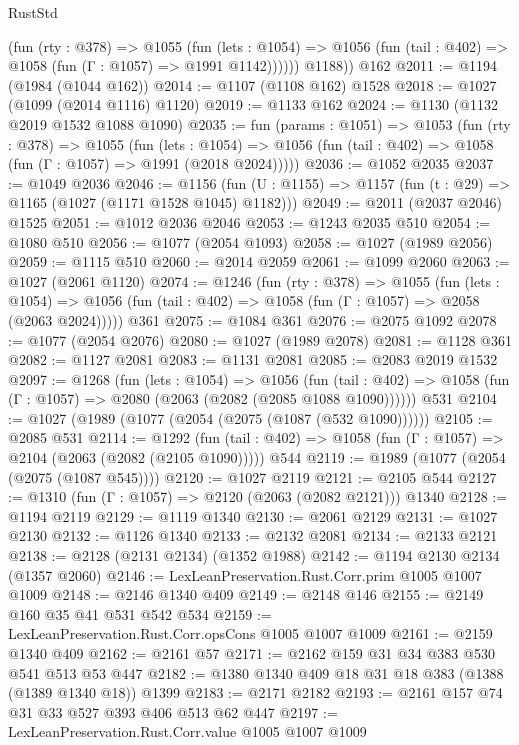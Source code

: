 \begin{lexlean}{RustStd}
\begin{coremodule}
            (fun (rty : @378) =>
            @1055
              (fun (lets : @1054) =>
              @1056 (fun (tail : @402) => @1058 (fun (Γ : @1057) => @1991 @1142))))))
        @1188))
    @162
@2011 := @1194 (@1984 (@1044 @162))
@2014 := @1107 (@1108 @162) @1528
@2018 := @1027 (@1099 (@2014 @1116) @1120)
@2019 := @1133 @162
@2024 := @1130 (@1132 @2019 @1532 @1088 @1090)
@2035 := fun (params : @1051) =>
  @1053
    (fun (rty : @378) =>
    @1055
      (fun (lets : @1054) =>
      @1056 (fun (tail : @402) => @1058 (fun (Γ : @1057) => @1991 (@2018 @2024)))))
@2036 := @1052 @2035
@2037 := @1049 @2036
@2046 := @1156 (fun (U : @1155) => @1157 (fun (t : @29) => @1165 (@1027 (@1171 @1528 @1045) @1182)))
@2049 := @2011 (@2037 @2046) @1525
@2051 := @1012 @2036 @2046
@2053 := @1243 @2035 @510
@2054 := @1080 @510
@2056 := @1077 (@2054 @1093)
@2058 := @1027 (@1989 @2056)
@2059 := @1115 @510
@2060 := @2014 @2059
@2061 := @1099 @2060
@2063 := @1027 (@2061 @1120)
@2074 := @1246
    (fun (rty : @378) =>
    @1055
      (fun (lets : @1054) =>
      @1056 (fun (tail : @402) => @1058 (fun (Γ : @1057) => @2058 (@2063 @2024)))))
    @361
@2075 := @1084 @361
@2076 := @2075 @1092
@2078 := @1077 (@2054 @2076)
@2080 := @1027 (@1989 @2078)
@2081 := @1128 @361
@2082 := @1127 @2081
@2083 := @1131 @2081
@2085 := @2083 @2019 @1532
@2097 := @1268
    (fun (lets : @1054) =>
    @1056
      (fun (tail : @402) => @1058 (fun (Γ : @1057) => @2080 (@2063 (@2082 (@2085 @1088 @1090))))))
    @531
@2104 := @1027 (@1989 (@1077 (@2054 (@2075 (@1087 (@532 @1090))))))
@2105 := @2085 @531
@2114 := @1292
    (fun (tail : @402) => @1058 (fun (Γ : @1057) => @2104 (@2063 (@2082 (@2105 @1090)))))
    @544
@2119 := @1989 (@1077 (@2054 (@2075 (@1087 @545))))
@2120 := @1027 @2119
@2121 := @2105 @544
@2127 := @1310 (fun (Γ : @1057) => @2120 (@2063 (@2082 @2121))) @1340
@2128 := @1194 @2119
@2129 := @1119 @1340
@2130 := @2061 @2129
@2131 := @1027 @2130
@2132 := @1126 @1340
@2133 := @2132 @2081
@2134 := @2133 @2121
@2138 := @2128 (@2131 @2134) (@1352 @1988)
@2142 := @1194 @2130 @2134 (@1357 @2060)
@2146 := LexLeanPreservation.Rust.Corr.prim @1005 @1007 @1009
@2148 := @2146 @1340 @409
@2149 := @2148 @146
@2155 := @2149 @160 @35 @41 @531 @542 @534
@2159 := LexLeanPreservation.Rust.Corr.opsCons @1005 @1007 @1009
@2161 := @2159 @1340 @409
@2162 := @2161 @57
@2171 := @2162 @159 @31 @34 @383 @530 @541 @513 @53 @447
@2182 := @1380 @1340 @409 @18 @31 @18 @383 (@1388 (@1389 @1340 @18)) @1399
@2183 := @2171 @2182
@2193 := @2161 @157 @74 @31 @33 @527 @393 @406 @513 @62 @447
@2197 := LexLeanPreservation.Rust.Corr.value @1005 @1007 @1009

\end{coremodule}
\end{lexlean}
